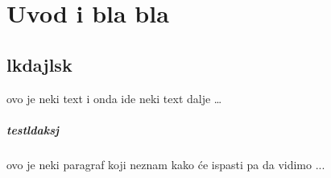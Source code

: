\chapter{Uvod i bla bla}
\section{lkdajlsk}
ovo je neki text
i onda ide neki text dalje \ldots
\paragraph{testldaksj}
ovo je neki paragraf koji neznam kako će ispasti pa da vidimo ...